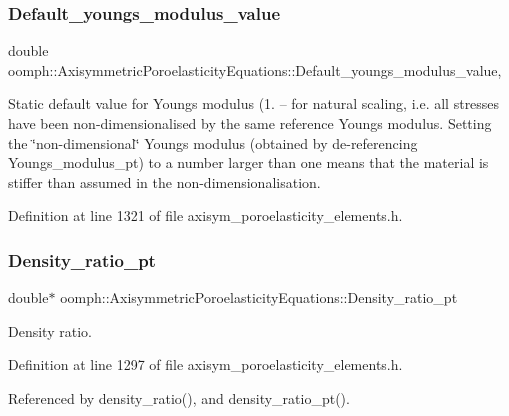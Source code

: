 \subsubsection{\texorpdfstring{Default\+\_\+youngs\+\_\+modulus\+\_\+value}{Default\_youngs\_modulus\_value}}
{\footnotesize\ttfamily double oomph\+::\+Axisymmetric\+Poroelasticity\+Equations\+::\+Default\+\_\+youngs\+\_\+modulus\+\_\+value\hspace{0.3cm}{\ttfamily [static]}, {\ttfamily [private]}}

Static default value for Young\textquotesingle{}s modulus (1. -- for natural scaling, i.\+e. all stresses have been non-\/dimensionalised by the same reference Young\textquotesingle{}s modulus. Setting the \char`\"{}non-\/dimensional\char`\"{} Young\textquotesingle{}s modulus (obtained by de-\/referencing Youngs\+\_\+modulus\+\_\+pt) to a number larger than one means that the material is stiffer than assumed in the non-\/dimensionalisation. 

Definition at line 1321 of file axisym\+\_\+poroelasticity\+\_\+elements.\+h.

\mbox{\label{classoomph_1_1AxisymmetricPoroelasticityEquations_aed5ac193baa2b0920ec5d454ac5a0ed1}} 
\subsubsection{\texorpdfstring{Density\+\_\+ratio\+\_\+pt}{Density\_ratio\_pt}}
{\footnotesize\ttfamily double$\ast$ oomph\+::\+Axisymmetric\+Poroelasticity\+Equations\+::\+Density\+\_\+ratio\+\_\+pt\hspace{0.3cm}{\ttfamily [private]}}



Density ratio. 



Definition at line 1297 of file axisym\+\_\+poroelasticity\+\_\+elements.\+h.



Referenced by density\+\_\+ratio(), and density\+\_\+ratio\+\_\+pt().

\mbox{\label{classoomph_1_1AxisymmetricPoroelasticityEquations_a5e1e4b731368a93def0573d9a2732efd}} 

